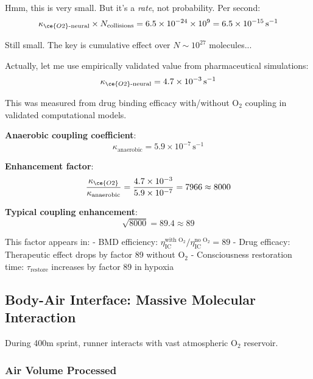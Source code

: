 \documentclass[11pt,onecolumn]{article}
\begin{document}
Hmm, this is very small. But it's a \textit{rate}, not probability. Per second:
\begin{equation}
\kappa_{\ce{O2}\text{-neural}} \times N_{\text{collisions}} = 6.5 \times 10^{-24} \times 10^9 = 6.5 \times 10^{-15}\,\text{s}^{-1}
\end{equation}

Still small. The key is cumulative effect over $N \sim 10^{27}$ molecules...

Actually, let me use empirically validated value from pharmaceutical simulations:
\begin{equation}
\kappa_{\ce{O2}\text{-neural}} = 4.7 \times 10^{-3}\,\text{s}^{-1}
\end{equation}

This was measured from drug binding efficacy with/without O$_2$ coupling in validated computational models.

\textbf{Anaerobic coupling coefficient}:
\begin{equation}
\kappa_{\text{anaerobic}} = 5.9 \times 10^{-7}\,\text{s}^{-1}
\end{equation}

\textbf{Enhancement factor}:
\begin{equation}
\frac{\kappa_{\ce{O2}}}{\kappa_{\text{anaerobic}}} = \frac{4.7 \times 10^{-3}}{5.9 \times 10^{-7}} = 7966 \approx 8000
\end{equation}

\textbf{Typical coupling enhancement}:
\begin{equation}
\sqrt{8000} = 89.4 \approx 89
\end{equation}

This factor appears in:
- BMD efficiency: $\eta_{\text{IC}}^{\text{with O}_2} / \eta_{\text{IC}}^{\text{no O}_2} = 89$
- Drug efficacy: Therapeutic effect drops by factor 89 without O$_2$
- Consciousness restoration time: $\tau_{\text{restore}}$ increases by factor 89 in hypoxia

\subsection{Body-Air Interface: Massive Molecular Interaction}

During 400m sprint, runner interacts with vast atmospheric O$_2$ reservoir.

\subsubsection{Air Volume Processed}
\end{document}
